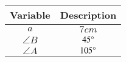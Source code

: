 \begin{tabular}[12pt]{ |c| c|}
    \hline
    \textbf{Variable} & \textbf{Description}\\ 
    \hline
    $a$ & $7cm$\\
    \hline 
    $\angle{B}$ & $45\degree$\\
    \hline
    $\angle{A}$ & $105\degree$\\
    \hline
    \end{tabular}



